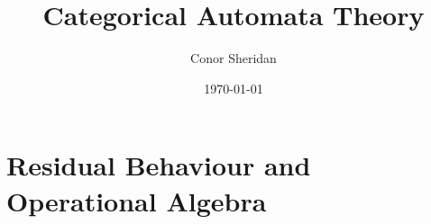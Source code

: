 \documentclass[oneside]{book}
\title{Categorical Automata Theory}
\author{Conor Sheridan}
\date{\today}
\begin{document}
    \maketitle
    \tableofcontents

    

    \part{Residual Behaviour and Operational Algebra}
    
    
    
    

    






    
    
    
    \printbibliography
\end{document}
